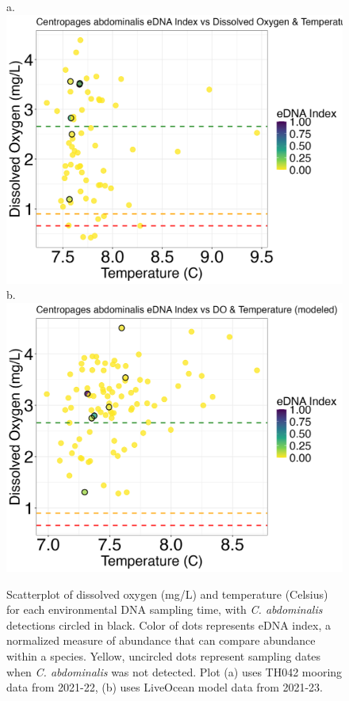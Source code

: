 \documentclass[12pt,twoside]{reedthesis}
\begin{document}
	\begin{figure}[!h]
		\begin{center}
			a. \includegraphics[scale=0.3]{Cabdominalis_Scatter_noOut}
			b. \includegraphics[scale=0.3]{Cabdominalis_Scatter_AllYr_mod_noOut}
			\caption[\textit{C. abdominalis} scatterplot]{\footnotesize{Scatterplot of dissolved oxygen (mg/L) and temperature (Celsius) for each environmental DNA sampling time, with \textit{C. abdominalis} detections circled in black. Color of dots represents eDNA index, a normalized measure of abundance that can compare abundance within a species. Yellow, uncircled dots represent sampling dates when \textit{C. abdominalis} was not detected. Plot (a) uses TH042 mooring data from 2021-22, (b) uses LiveOcean model data from 2021-23.}} %
			\label{CabdominalisScatter}
		\end{center}
	\end{figure} 
	
\end{document}
